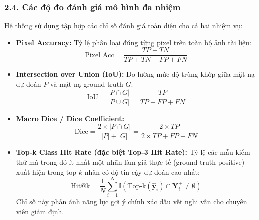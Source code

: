 \subsubsection{2.4. Các độ đo đánh giá mô hình đa nhiệm}
\indent\indent Hệ thống sử dụng tập hợp các chỉ số đánh giá toàn diện cho cả hai nhiệm vụ:\vspace{-0.1cm}
\begin{itemize}[label={--}, itemsep=1pt]
    \item \textbf{Pixel Accuracy:} Tỷ lệ phân loại đúng từng pixel trên toàn bộ ảnh tài liệu:
    \begin{equation}
    \text{Pixel Acc} = \frac{TP + TN}{TP + TN + FP + FN}
    \end{equation}
    \item \textbf{Intersection over Union (IoU):} Đo lường mức độ trùng khớp giữa mặt nạ dự đoán $P$ và mặt nạ ground-truth $G$:
    \begin{equation}
    \text{IoU} = \frac{|P \cap G|}{|P \cup G|} = \frac{TP}{TP + FP + FN}
    \end{equation}
    \item \textbf{Macro Dice / Dice Coefficient:}
    \begin{equation}
    \text{Dice} = \frac{2 \times |P \cap G|}{|P| + |G|} = \frac{2 \times TP}{2 \times TP + FP + FN}
    \end{equation}
    \item \textbf{Top-k Class Hit Rate (đặc biệt Top-3 Hit Rate):} Tỷ lệ các mẫu kiểm thử mà trong đó ít nhất một nhãn làm giả thực tế (ground-truth positive) xuất hiện trong top $k$ nhãn có độ tin cậy dự đoán cao nhất:
    \begin{equation}
    \text{Hit@k} = \frac{1}{N} \sum_{i=1}^{N} \mathbb{I} \left( \text{Top-k}(\hat{\mathbf{y}}_i) \cap \mathbf{Y}_i^+ \neq \emptyset \right)
    \end{equation}
    Chỉ số này phản ánh năng lực gợi ý chính xác dấu vết nghi vấn cho chuyên viên giám định.
\end{itemize}
